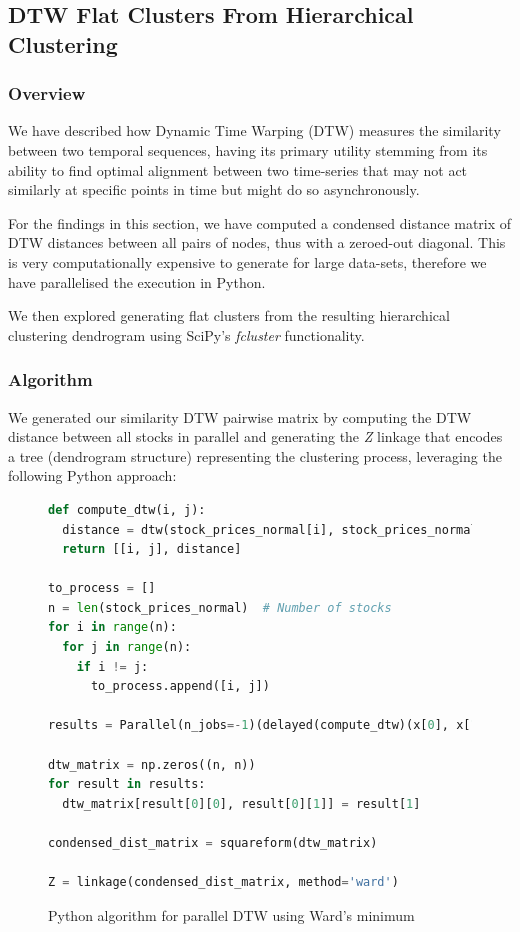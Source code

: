 \documentclass[11pt]{article}
\begin{document}
\subsection{DTW Flat Clusters From Hierarchical Clustering}

\subsubsection{Overview}
We have described how Dynamic Time Warping (DTW) measures the similarity between two temporal sequences, having its primary utility stemming from its ability to find optimal alignment between two time-series that may not act similarly at specific points in time but might do so asynchronously.
 
For the findings in this section, we have computed a condensed distance matrix of DTW distances between all pairs of nodes, thus with a zeroed-out diagonal. This is very computationally expensive to generate for large data-sets, therefore we have parallelised the execution in Python.

 We then explored generating flat clusters from the resulting hierarchical clustering dendrogram using SciPy's \textit{fcluster} functionality. 

\subsubsection{Algorithm}

We generated our similarity DTW pairwise matrix by computing the DTW distance between all stocks in parallel and generating the \textit{Z} linkage that encodes a tree (dendrogram structure) representing the clustering process, leveraging the following Python approach:

\begin{figure}[H]
\centering
\begin{center}
\begin{lstlisting}[language=Python]
def compute_dtw(i, j):
  distance = dtw(stock_prices_normal[i], stock_prices_normal[j])
  return [[i, j], distance]

to_process = []
n = len(stock_prices_normal)  # Number of stocks
for i in range(n):
  for j in range(n):
    if i != j:
      to_process.append([i, j])

results = Parallel(n_jobs=-1)(delayed(compute_dtw)(x[0], x[1]) for x in to_process)

dtw_matrix = np.zeros((n, n))
for result in results:
  dtw_matrix[result[0][0], result[0][1]] = result[1]

condensed_dist_matrix = squareform(dtw_matrix)

Z = linkage(condensed_dist_matrix, method='ward')
\end{lstlisting}
\end{center}
\caption{Python algorithm for parallel DTW using Ward's minimum}
\end{figure}
\end{document}
